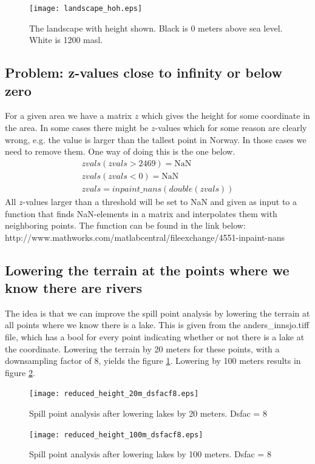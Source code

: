 \documentclass[10pt,a4paper]{article}
\begin{document}
\begin{figure}[H]
  \centering
    \texttt{[image: landscape\_hoh.eps]}
  \caption{The landscape with height shown. Black is 0 meters above sea level. White is 1200 masl.}
\end{figure}

\subsection{Problem: z-values close to infinity or below zero}
For a given area we have a matrix $z$ which gives the height for some coordinate in the area. In some cases there might be $z$-values which for some reason are clearly wrong, e.g. the value is larger than the tallest point in Norway. In those cases we need to remove them. One way of doing this is the one below.
\begin{align}
zvals(zvals > 2469) = \textrm{NaN}\\
zvals(zvals < 0) = \textrm{NaN}\\
zvals = inpaint\_nans(double(zvals))
\end{align}
All $z$-values larger than a threshold will be set to NaN and given as input to a function that finds NaN-elements in a matrix and interpolates them with neighboring points. The function can be found in the link below:\\
 http://www.mathworks.com/matlabcentral/fileexchange/4551-inpaint-nans


\subsection{Lowering the terrain at the points where we know there are rivers}
The idea is that we can improve the spill point analysis by lowering the terrain at all points where we know there is a lake. This is given from the anders\_innsjo.tiff file, which has a bool for every point indicating whether or not there is a lake at the coordinate. Lowering the terrain by 20 meters for these points, with a downsampling factor of 8, yields the figure \ref{fig:lowered_20m_dsfac8}. Lowering by 100 meters results in figure \ref{fig:lowered_100m_dsfac8}.

\begin{figure}[H]
  \centering
    \texttt{[image: reduced\_height\_20m\_dsfacf8.eps]}
  \caption{Spill point analysis after lowering lakes by 20 meters. Dsfac = 8}
  \label{fig:lowered_20m_dsfac8} 
\end{figure}

\begin{figure}[H]
  \centering
    \texttt{[image: reduced\_height\_100m\_dsfacf8.eps]}
  \caption{Spill point analysis after lowering lakes by 100 meters. Dsfac = 8}
  \label{fig:lowered_100m_dsfac8}
\end{figure}
\end{document}
